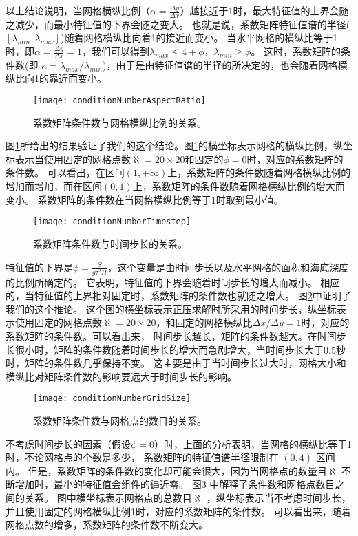 以上结论说明，当网格横纵比例（$\alpha  = \frac{ \Delta y}{ \Delta x }$）越接近于1时，最大特征值的上界会随之减少，而最小特征值的下界会随之变大。
也就是说，系数矩阵特征值谱的半径($[\lambda_{min}, \lambda_{max}]$)随着网格横纵比向着1的接近而变小。 
当水平网格的横纵比等于1时，即$ \alpha = \frac{ \Delta y}{ \Delta x} = 1$，我们可以得到$\lambda_{max} \le  4 +\phi$，$\lambda_{min} \ge   \phi$。
这时，系数矩阵的条件数(即 $\kappa=  \lambda_{max}/\lambda_{min}$)，由于是由特征值谱的半径的所决定的，也会随着网格横纵比向1的靠近而变小。 

\begin{figure}[ht]
\centering
\texttt{[image: conditionNumberAspectRatio]}
\caption[] {系数矩阵条件数与网格横纵比例的关系。 \label{fig:conditionNumberRatio}}
\end{figure}
图\ref{fig:conditionNumberRatio}所给出的结果验证了我们的这个结论。图\ref{fig:conditionNumberRatio}的横坐标表示网格的横纵比例，纵坐标表示当使用固定的网格点数$\aleph = 20\times 20$和固定的$\phi = 0$时，对应的系数矩阵的条件数。 
可以看出，在区间$(1, +\infty)$上，系数矩阵的条件数随着网格横纵比例的增加而增加，而在区间$(0,1)$上，系数矩阵的条件数随着网格横纵比例的增大而变小。
系数矩阵的条件数在当网格横纵比例等于1时取到最小值。
 
\begin{figure}[ht]
\centering
\texttt{[image: conditionNumberTimestep]}
\caption[] {系数矩阵条件数与时间步长的关系。 \label{fig:conditionNumberDt}}
\end{figure}
特征值的下界是$\phi=\frac{S }{g \tau^2 H}$，这个变量是由时间步长以及水平网格的面积和海底深度的比例所确定的。
它表明，特征值的下界会随着时间步长的增大而减小。 
相应的，当特征值的上界相对固定时，系数矩阵的条件数也就随之增大。
图\ref{fig:conditionNumberDt}中证明了我们的这个推论。
这个图的横坐标表示正压求解时所采用的时间步长，纵坐标表示使用固定的网格点数$\aleph= 20\times 20$，和固定的网格横纵比$\Delta x /{\Delta y} = 1$时，对应的系数矩阵的条件数。可以看出来， 时间步长越长，矩阵的条件数越大。在时间步长很小时，矩阵的条件数随着时间步长的增大而急剧增大，当时间步长大于0.5秒时，矩阵的条件数几乎保持不变。
这主要是由于当时间步长过大时，网格大小和横纵比对矩阵条件数的影响要远大于时间步长的影响。

\begin{figure}[ht]
\centering
\texttt{[image: conditionNumberGridSize]}
\caption[] {系数矩阵条件数与网格点的数目的关系。 \label{fig:conditionNumbGrid}}
\end{figure}
 
不考虑时间步长的因素（假设$\phi=0$）时，上面的分析表明，当网格的横纵比等于1时，不论网格点的个数是多少， 系数矩阵的特征值谱半径限制在 $(0,4)$ 区间内。
但是，系数矩阵的条件数的变化却可能会很大，因为当网格点的数量目$\aleph$ 不断增加时，最小的特征值会组件的逼近零。 
图\ref{fig:conditionNumbGrid} 中解释了条件数和网格点数目之间的关系。 
图中横坐标表示网格点的总数目$\aleph$ ，纵坐标表示当不考虑时间步长，并且使用固定的网格横纵比例1时，对应的系数矩阵的条件数。
可以看出来，随着网格点数的增多，系数矩阵的条件数不断变大。



